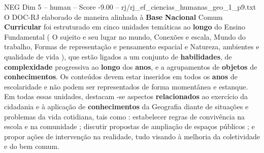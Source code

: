 \begin{textsample}{NEG Dim 5 – human – Score -9.00 – rj/rj\_ef\_ciencias\_humanas\_geo\_1\_p9.txt}  \label{ex:f5_neg_019}
O DOC-RJ elaborado de maneira alinhada à \textbf{Base} \textbf{Nacional} Comum \textbf{Curricular} foi estruturado em cinco unidades temáticas ao \textbf{longo} do Ensino Fundamental ( O sujeito e seu lugar no mundo, Conexões e escala, Mundo do trabalho, Formas de representação e pensamento espacial e Natureza, ambientes e qualidade de vida ), que estão ligados a um conjunto de \textbf{habilidades}, de \textbf{complexidade} progressiva ao \textbf{longo} dos \textbf{anos}, e a agrupamentos de \textbf{objetos} de \textbf{conhecimentos}.
Os conteúdos devem estar inseridos em todos os \textbf{anos} de escolaridade e não podem ser representados de forma momentânea e estanque.
Em todas essas unidades, destacam -se aspectos \textbf{relacionados} ao exercício da cidadania e à aplicação de \textbf{conhecimentos} da Geografia diante de situações e problemas da vida cotidiana, tais como : estabelecer regras de convivência na escola e na comunidade ; discutir propostas de ampliação de espaços públicos ; e propor ações de intervenção na realidade, tudo visando à melhoria da coletividade e do bem comum.

\end{textsample}
